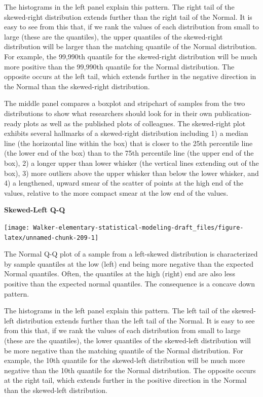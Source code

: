 \documentclass[]{book}
\begin{document}
The histograms in the left panel explain this pattern. The right tail of the skewed-right distribution extends further than the right tail of the Normal. It is easy to see from this that, if we rank the values of each distribution from small to large (these are the quantiles), the upper quantiles of the skewed-right distribution will be larger than the matching quantile of the Normal distribution. For example, the 99,990th quantile for the skewed-right distribution will be much more positive than the 99,990th quantile for the Normal distribution. The opposite occurs at the left tail, which extends further in the negative direction in the Normal than the skewed-right distribution.

The middle panel compares a boxplot and stripchart of samples from the two distributions to show what researchers should look for in their own publication-ready plots as well as the published plots of colleagues. The skewed-right plot exhibits several hallmarks of a skewed-right distribution including 1) a median line (the horizontal line within the box) that is closer to the 25th percentile line (the lower end of the box) than to the 75th percentile line (the upper end of the box), 2) a longer upper than lower whisker (the vertical lines extending out of the box), 3) more outliers above the upper whisker than below the lower whisker, and 4) a lengthened, upward smear of the scatter of points at the high end of the values, relative to the more compact smear at the low end of the values.

\textbf{Skewed-Left Q-Q}

\texttt{[image: Walker-elementary-statistical-modeling-draft\_files/figure-latex/unnamed-chunk-209-1]}

The Normal Q-Q plot of a sample from a left-skewed distribution is characterized by sample quantiles at the low (left) end being more negative than the expected Normal quantiles. Often, the quantiles at the high (right) end are also less positive than the expected normal quantiles. The consequence is a concave down pattern.

The histograms in the left panel explain this pattern. The left tail of the skewed-left distribution extends further than the left tail of the Normal. It is easy to see from this that, if we rank the values of each distribution from small to large (these are the quantiles), the lower quantiles of the skewed-left distribution will be more negative than the matching quantile of the Normal distribution. For example, the 10th quantile for the skewed-left distribution will be much more negative than the 10th quantile for the Normal distribution. The opposite occurs at the right tail, which extends further in the positive direction in the Normal than the skewed-left distribution.
\end{document}
